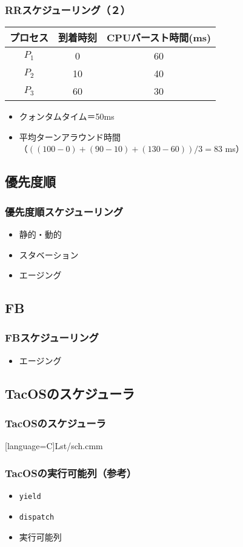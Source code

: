 \documentclass{beamer}                   %
\begin{document}
\begin{frame}
  \frametitle{RRスケジューリング（２）}
  \small\begin{tabular}{c c c}
    プロセス & 到着時刻 & CPUバースト時間(ms) \\
    \hline
    $P_1$    & 0  & 60 \\
    $P_2$    & 10 & 40 \\
    $P_3$    & 60 & 30 \\
  \end{tabular}
  \begin{itemize}
    \item クォンタムタイム＝50ms
    \item 平均ターンアラウンド時間\\
      （$((100-0)+(90-10)+(130-60))/3=83$ ms）
  \end{itemize}
\end{frame}

\subsection{優先度順}
\begin{frame}
  \frametitle{優先度順スケジューリング}
  \begin{itemize}
    \item 静的・動的
    \item スタベーション
    \item エージング
  \end{itemize}
\end{frame}


\subsection{FB}
\begin{frame}
  \frametitle{FBスケジューリング}
  \begin{itemize}
    \item エージング
  \end{itemize}
\end{frame}

\subsection{TacOSのスケジューラ}
\begin{frame}[fragile]
  \frametitle{TacOSのスケジューラ}
  
      [language={C}]{Lst/sch.cmm}
\end{frame}

\begin{frame}
  \frametitle{TacOSの実行可能列（参考）}
  \begin{itemize}
    \item {\tt yield}
    \item {\tt dispatch}
    \item 実行可能列
  \end{itemize}
\end{frame}
\end{document}
